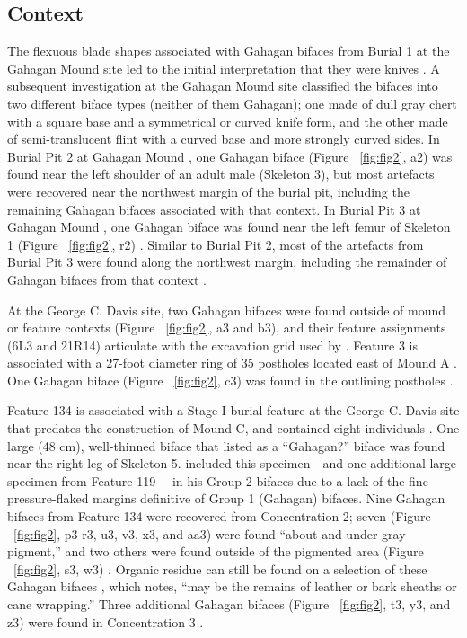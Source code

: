 \documentclass[review]{elsarticle}
\begin{document}
\subsection*{Context}

The flexuous blade shapes associated with Gahagan bifaces from Burial 1 at the Gahagan Mound site led to the initial interpretation that they were knives \citep[Figures 18-21]{RN2740}. A subsequent investigation at the Gahagan Mound site \citep{RN5274} classified the bifaces into two different biface types (neither of them Gahagan); one made of dull gray chert with a square base and a symmetrical or curved knife form, and the other made of semi-translucent flint with a curved base and more strongly curved sides. In Burial Pit 2 at Gahagan Mound \citep[Plate 21]{RN5274}, one Gahagan biface (Figure ~\ref{fig:fig2}, a2) \citep[Plate 27, No. 1, 3]{RN5274} was found near the left shoulder of an adult male (Skeleton 3), but most artefacts were recovered near the northwest margin of the burial pit, including the remaining Gahagan bifaces associated with that context. In Burial Pit 3 at Gahagan Mound \citep[Plate 23, 1]{RN5274}, one Gahagan biface was found near the left femur of Skeleton 1 (Figure ~\ref{fig:fig2}, r2) \citep[Plate 27, No. 1, 2]{RN5274}. Similar to Burial Pit 2, most of the artefacts from Burial Pit 3 were found along the northwest margin, including the remainder of Gahagan bifaces from that context \citep{RN5274}.

At the George C. Davis site, two Gahagan bifaces were found outside of mound or feature contexts (Figure ~\ref{fig:fig2}, a3 and b3), and their feature assignments (6L3 and 21R14) articulate with the excavation grid used by \cite{RN800}. Feature 3 is associated with a 27-foot diameter ring of 35 postholes located east of Mound A \citep[Figure 4]{RN800}. One Gahagan biface (Figure ~\ref{fig:fig2}, c3) was found in the outlining postholes \cite{RN800}.

Feature 134 is associated with a Stage I burial feature at the George C. Davis site that predates the construction of Mound C, and contained eight individuals \citep{RN808,RN5050}. One large (48 cm), well-thinned biface that \citet[22]{RN808} listed as a “Gahagan?” biface was found near the right leg of Skeleton 5.  \citet[Figure 19x]{RN3684} included this specimen---and one additional large specimen from Feature 119 \citep[Figure 19w]{RN3684}---in his Group 2 bifaces due to a lack of the fine pressure-flaked margins definitive of Group 1 (Gahagan) bifaces. Nine Gahagan bifaces from Feature 134 were recovered from Concentration 2; seven (Figure ~\ref{fig:fig2}, p3-r3, u3, v3, x3, and aa3) were found “about and under gray pigment,” and two others were found outside of the pigmented area (Figure ~\ref{fig:fig2}, s3, w3) \citep[21-23 and Figure 12]{RN808}. Organic residue can still be found on a selection of these Gahagan bifaces \citep[Figure 2]{RN11783}, which \citet[228]{RN3684} notes, “may be the remains of leather or bark sheaths or cane wrapping.” Three additional Gahagan bifaces (Figure ~\ref{fig:fig2}, t3, y3, and z3) were found in Concentration 3 \citep[21-22 and Figure 12]{RN808}.
\end{document}
